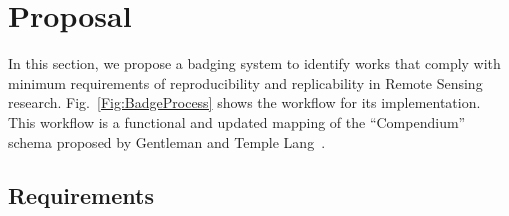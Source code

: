 \documentclass[journal,twoside]{IEEEtran}
\begin{document}
\section{Proposal}\label{Sec:Proposal}

In this section, we propose a badging system to identify works that comply with minimum requirements of reproducibility and replicability in Remote Sensing research.
Fig.~\ref{Fig:BadgeProcess} shows the workflow for its implementation.
This workflow is a functional and updated mapping of the ``Compendium'' schema proposed by Gentleman and Temple Lang~\cite{StatisticalAnalysesReproducibleResearch}.

\subsection{Requirements}\label{Sec:Requirements}
\end{document}
